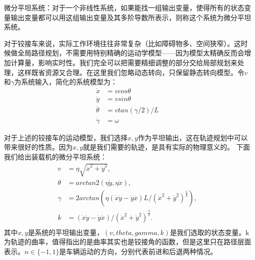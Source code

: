 \documentclass[master,academic]{ysuthesis} %
\begin{document}
		微分平坦系统：对于一个非线性系统，如果能找一组输出变量，使得所有的状态变量输出变量都可以用这组输出变量及其多阶导数所表示，则称这个系统为微分平坦系统。

		对于铰接车来说，实际工作环境往往非常复杂（比如障碍物多、空间狭窄）。这时候做全局路径规划，不需要用特别精确的运动学模型——因为模型太精确反而会增加计算量，影响实时性。我们完全可以把需要精细调整的部分交给局部规划来处理，这样既省资源又合理。在这里我们忽略动态转向，只保留静态转向模型。令$v$和$\gamma$为系统输入，简化的系统模型为：
		\begin{equation}
			\begin{aligned}
				\dot{x} &= vcos\theta\\
				\dot{y} &= vsin\theta\\
				\dot{\theta} &= vtan( \gamma /2 ) /L\\
				\dot{\gamma} &= \omega
			\end{aligned}
		\end{equation}
	

		对于上述的铰接车的运动模型，我们选择$x,y$作为平坦输出，这在轨迹规划中可以带来很好的性质。因为$x,y$就是我们需要的轨迹，是具有实际的物理意义的。
		下面我们给出装载机的微分平坦系统：
		\begin{equation}
			\begin{aligned}
				v&=\eta \sqrt{\dot{x}^2+\dot{y}^2},\\
				\theta &=arctan2( \eta \dot{y},\eta \dot{x} ) ,\\
				\gamma &=2arctan( \eta ( \dot{x}\ddot{y}-\dot{y}\ddot{x} ) L/( \dot{x}^2+\dot{y}^2 ) ^{\frac{3}{2}} ) ,\\
				k&=( \dot{x}\ddot{y}-\dot{y}\ddot{x} ) /( \dot{x}^2+\dot{y}^2 ) ^{\frac{3}{2}}.\\
			\end{aligned}
		\end{equation}
	其中$x,y$是系统的平坦输出变量，$(v,theta,gamma,k)$是我们选取的状态变量。k为轨迹的曲率，值得指出的是曲率其实也是铰接角的函数，但是这里只在路径层面表示。$n\in\{-1,1\}$是车辆运动的方向，分别代表前进和后退两种情况。
\end{document}
